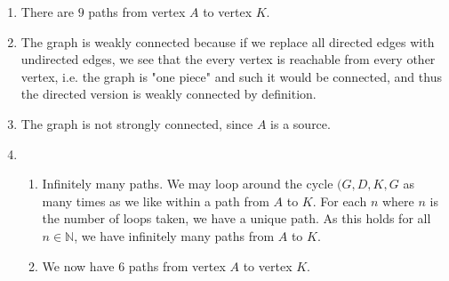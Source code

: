 \documentclass[10pt,oneside,reqno]{amsart}
\theoremstyle{plain}
\theoremstyle{definition}
\begin{document}
\begin{enumerate}[label=\arabic*.]
\begin{enumerate}
\vspace{40mm}

\item There are $9$ paths from vertex $A$ to vertex $K$. 


\item The graph is weakly connected because if we replace all directed edges with undirected edges, we see that the every vertex is reachable from every other vertex, i.e. the graph is "one piece" and such it would be connected, and thus the directed version is weakly connected by definition. \\

\item The graph is not strongly connected, since $A$ is a source. \\

\item 

\begin{enumerate}

\item Infinitely many paths. We may loop around the cycle $(G,D,K,G$ as many times as we like within a path from $A$ to $K$. For each $n$ where $n$ is the number of loops taken, we have a unique path. As this holds for all $n \in \mathbb{N}$, we have infinitely many paths from $A$ to $K$. \\

\item We now have $6$ paths from vertex $A$ to vertex $K$. 

\end{enumerate}
\end{enumerate}
\end{enumerate}
\end{document}
